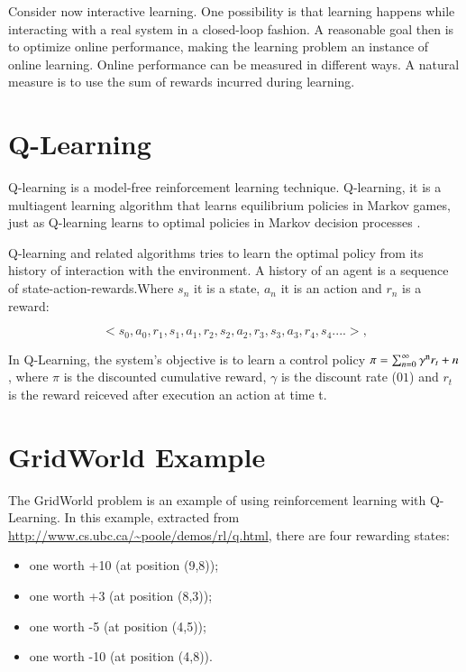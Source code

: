 Consider now interactive learning. One possibility is that learning happens while interacting
with a real system in a closed-loop fashion. A reasonable goal then is to optimize online performance,
making the learning problem an instance of online learning. Online performance
can be measured in different ways. A natural measure is to use the sum of rewards incurred
during learning. 




\section{Q-Learning}

Q-learning is a model-free reinforcement learning technique. Q-learning, it is a multiagent learning algorithm that learns equilibrium policies in Markov games, just as Q-learning learns to optimal policies in Markov decision processes \cite{Greenwald2003}. 

Q-learning and related algorithms tries to learn the optimal policy from its history of interaction with the environment. A history of an agent is a sequence of state-action-rewards.Where $s_{n}$ it is a state, $a_{n}$ it is an action and $r_{n}$ is a reward:

\begin{equation}
<s_{0},a_{0},r_{1},s_{1},a_{1},r_{2},s_{2},a_{2},r_{3},s_{3},a_{3},r_{4},s_{4}....>,
\end{equation}


In Q-Learning, the system's objective is to learn a control policy $\pi = \sum_{n=0}^{\infty} \gamma\textsuperscript{n}  r_{t}+n $, where $\pi$  is the discounted cumulative reward, $\gamma$ is the discount rate ($01$) and $r_{t}$ is the reward reiceved after execution an action at time t.

\section{GridWorld Example}

The GridWorld problem is an example of using reinforcement learning with Q-Learning. In this example, extracted from \url{http://www.cs.ubc.ca/~poole/demos/rl/q.html}, there are four rewarding states:

\begin{itemize}
\item one worth +10 (at position (9,8));
\item one worth +3 (at position (8,3));
\item one worth -5 (at position (4,5));
\item one worth -10 (at position (4,8)).
\end{itemize}


